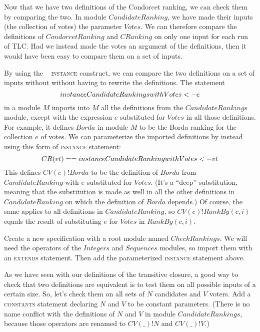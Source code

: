 \documentclass[fleqn,leqno]{article}
\begin{document}
Now that we have two definitions of the Condorcet ranking, we can
check them by comparing the two.  In module $CandidateRanking$, we
have made their inputs (the collection of votes) the parameter
$Votes$.  We can therefore compare the definitions of
$CondorcetRanking$ and $CRanking$ on only one input for each run of
TLC\@.  Had we instead made the votes an argument of the definitions,
then it would have been easy to compare them on a set of inputs.

By using the \tlaplus\
\textsc{instance} construct, we can compare the two definitions on a
set of inputs without without having to rewrite the definitions.  The
statement
 \[ \INSTANCE CandidateRankings \WITH Votes <- e \]
in a module $M$ imports into $M$ all the definitions from the
$CandidateRankings$ module, except with the expression $e$ substituted for
$Votes$ in all those definitions.  For example, it defines $Borda$ in
module $M$ to be the Borda ranking for the collection $e$ of votes.
We can parameterize the imported definitions by instead using
this form of \textsc{instance} statement:
  \[ CR(vt) == \INSTANCE CandidateRanking \WITH Votes <- vt\]
This defines 
$CV(e)!Borda$ to be the definition of $Borda$ from 
$CandidateRanking$ with $e$ substituted for $Votes$.  (It's a
``deep'' substitution, meaning that the substitution is made as well
in all the other definitions in $CandidateRanking$ on which the
definition of $Borda$ depends.)  Of course, the same applies to all
definitions in $CandidateRanking$, so $CV(e)!RankBy(c,i)$ equals the
result of substituting $e$ for $Votes$ in $RankBy(c,i)$.

Create a new specification with a root module named $CheckRankings$.
We will need the operators of the $Integers$ and $Sequences$ modules,
so import them with an \textsc{extends} statement.  Then add the
parameterized \textsc{instance} statement above.

As we have seen with our definitions of the transitive closure, a good
way to check that two definitions are equivalent is to test them on
all possible inputs of a certain size.  So, let's check them on all
sets of $N$ candidates and $V$ voters.  Add a \textsc{constants}
statement declaring $N$ and $V$ to be constant parameters.  (There is
no name conflict with the definitions of $N$ and $V$ in module
$CandidateRankings$, because those operators are renamed to $CV(\_)!N$
and $CV(\_)!V$.)
\end{document}

